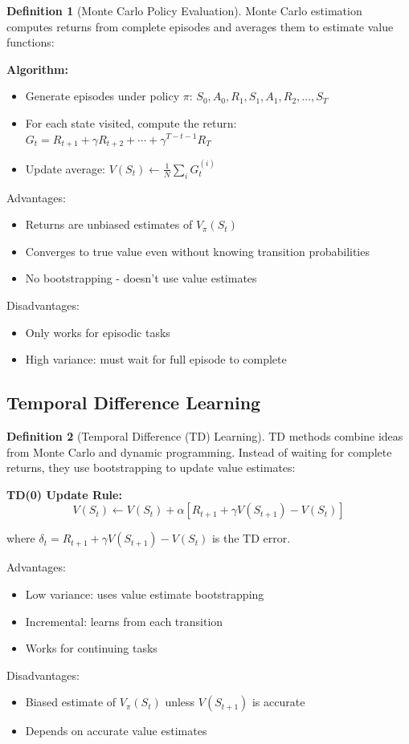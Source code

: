 \documentclass[12pt,a4paper]{article}
\theoremstyle{definition}
\newtheorem{definition}{Definition}[section]
\begin{document}
\begin{definition}[Monte Carlo Policy Evaluation]
Monte Carlo estimation computes returns from complete episodes and averages them to estimate value functions:

\textbf{Algorithm:}
\begin{itemize}
    \item Generate episodes under policy $\pi$: $S_0, A_0, R_1, S_1, A_1, R_2, \ldots, S_T$
    \item For each state visited, compute the return: $G_t = R_{t+1} + \gamma R_{t+2} + \cdots + \gamma^{T-t-1} R_T$
    \item Update average: $V(S_t) \leftarrow \frac{1}{N} \sum_i G_t^{(i)}$
\end{itemize}

Advantages:
\begin{itemize}
    \item Returns are unbiased estimates of $V_\pi(S_t)$
    \item Converges to true value even without knowing transition probabilities
    \item No bootstrapping - doesn't use value estimates
\end{itemize}

Disadvantages:
\begin{itemize}
    \item Only works for episodic tasks
    \item High variance: must wait for full episode to complete
\end{itemize}
\end{definition}

\subsection{Temporal Difference Learning}

\begin{definition}[Temporal Difference (TD) Learning]
TD methods combine ideas from Monte Carlo and dynamic programming. Instead of waiting for complete returns, they use bootstrapping to update value estimates:

\textbf{TD(0) Update Rule:}
\[
V(S_t) \leftarrow V(S_t) + \alpha [R_{t+1} + \gamma V(S_{t+1}) - V(S_t)]
\]

where $\delta_t = R_{t+1} + \gamma V(S_{t+1}) - V(S_t)$ is the TD error.

Advantages:
\begin{itemize}
    \item Low variance: uses value estimate bootstrapping
    \item Incremental: learns from each transition
    \item Works for continuing tasks
\end{itemize}

Disadvantages:
\begin{itemize}
    \item Biased estimate of $V_\pi(S_t)$ unless $V(S_{t+1})$ is accurate
    \item Depends on accurate value estimates
\end{itemize}
\end{definition}
\end{document}
